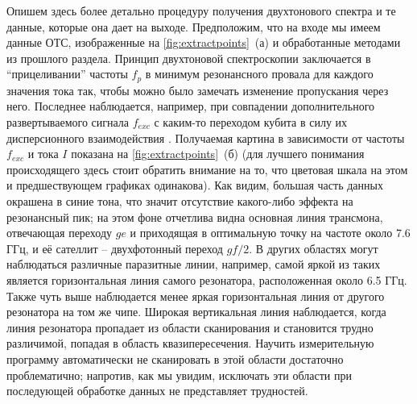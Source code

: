 \documentclass[14pt, a4paper]{extreport}
\numberwithin{equation}{section}
\begin{document}
	Опишем здесь более детально процедуру получения двухтонового спектра \cite{wallraff2007} и те данные, которые она дает на выходе. Предположим, что на входе мы имеем данные ОТС, изображенные на \autoref{fig:extractpoints}~(а) и обработанные методами из прошлого раздела. Принцип двухтоновой спектроскопии заключается в ``прицеливании'' частоты $f_p$ в минимум резонансного провала для каждого значения тока так, чтобы можно было замечать изменение пропускания через него. Последнее наблюдается, например, при совпадении дополнительного развертываемого сигнала $f_{exc}$ с каким-то переходом кубита в силу их дисперсионного взаимодействия \cite{blais2004cavity, koch2007charge}. Получаемая картина в зависимости от частоты $f_{exc}$ и тока $I$ показана на \autoref{fig:extractpoints}~(б) (для лучшего понимания происходящего здесь стоит обратить внимание на то, что цветовая шкала на этом и предшествующем графиках одинакова). Как видим, большая часть данных окрашена в синие тона, что значит отсутствие какого-либо эффекта на резонансный пик; на этом фоне отчетлива видна основная линия трансмона, отвечающая переходу $ge$ и приходящая в оптимальную точку на частоте около 7.6 ГГц, и её сателлит -- двухфотонный переход $gf/2$. В других областях могут наблюдаться различные паразитные линии, например, самой яркой из таких является горизонтальная линия самого резонатора, расположенная около 6.5 ГГц. Также чуть выше наблюдается менее яркая горизонтальная линия от другого резонатора на том же чипе. Широкая вертикальная линия наблюдается, когда линия резонатора пропадает из области сканирования и становится трудно различимой, попадая в область квазипересечения. Научить измерительную программу автоматически не сканировать в этой области достаточно проблематично; напротив, как мы увидим, исключать эти области при последующей обработке данных не представляет трудностей.
	
\end{document}
